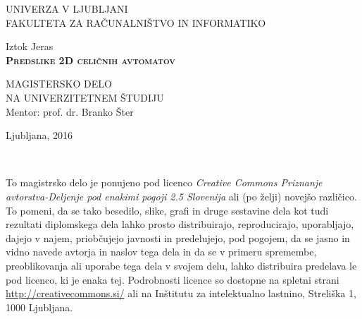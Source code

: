 \documentclass[12pt,a4paper,openany]{book}
\begin{document}
\thispagestyle{empty} 

\begin{center}
{\large 
UNIVERZA V LJUBLJANI\\
FAKULTETA ZA RAČUNALNIŠTVO IN INFORMATIKO\\
}

\vspace{3cm}
{\LARGE Iztok Jeras}\\

\vspace{2cm}
\textsc{\textbf{\LARGE 
Predslike 2D celičnih avtomatov
}}

\vspace{2cm}
{ MAGISTERSKO DELO}\\
{ NA UNIVERZITETNEM ŠTUDIJU}\\

\vspace{2cm} 
{\Large Mentor: prof. dr. Branko Šter}

\vfill
{\Large Ljubljana, 2016}
\end{center}

\newpage

\ \thispagestyle{empty}

\newpage


\thispagestyle{empty}

\vspace*{5cm}
{\small \noindent
To magistrsko delo je ponujeno pod licenco \textit{Creative Commons Priznanje avtorstva-Deljenje pod enakimi pogoji 2.5 Slovenija}
ali (po želji) novejšo različico.
To pomeni, da se tako besedilo, slike, grafi in druge sestavine dela kot tudi rezultati diplomskega dela lahko prosto distribuirajo,
reproducirajo, uporabljajo, dajejo v najem, priobčujejo javnosti in predelujejo, pod pogojem, da se jasno in vidno navede avtorja in naslov tega
dela in da se v primeru spremembe, preoblikovanja ali uporabe tega dela v svojem delu, lahko distribuira predelava le pod
licenco, ki je enaka tej.
Podrobnosti licence so dostopne na spletni strani \url{http://creativecommons.si/} ali na Inštitutu za
intelektualno lastnino, Streliška 1, 1000 Ljubljana.

\begin{center}%
  \hspace*{1ex}
\end{center}
}
\end{document}
